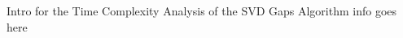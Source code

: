 \documentclass[../../ClusteringConnectionsMAIN.tex]{subfiles}
\begin{document}
\begin{flushleft}
\begin{large}

Intro for the Time Complexity Analysis of the SVD Gaps Algorithm info goes here


\end{large}
\end{flushleft}
\end{document}
